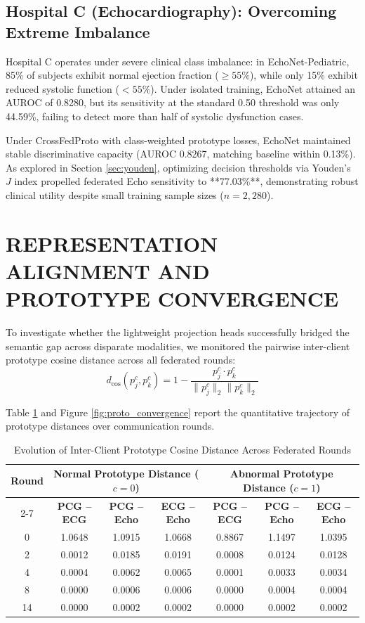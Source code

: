 \documentclass[12pt,a4paper]{amritareport}
\begin{document}
\subsection{Hospital C (Echocardiography): Overcoming Extreme Imbalance}
Hospital C operates under severe clinical class imbalance: in EchoNet-Pediatric, 85\% of subjects exhibit normal ejection fraction ($\geq 55\%$), while only 15\% exhibit reduced systolic function ($< 55\%$). Under isolated training, EchoNet attained an AUROC of 0.8280, but its sensitivity at the standard 0.50 threshold was only 44.59\%, failing to detect more than half of systolic dysfunction cases.

Under CrossFedProto with class-weighted prototype losses, EchoNet maintained stable discriminative capacity (AUROC 0.8267, matching baseline within 0.13\%). As explored in Section \ref{sec:youden}, optimizing decision thresholds via Youden's $J$ index propelled federated Echo sensitivity to **77.03\%**, demonstrating robust clinical utility despite small training sample sizes ($n=2,280$).


\section{REPRESENTATION ALIGNMENT AND PROTOTYPE CONVERGENCE}

To investigate whether the lightweight projection heads successfully bridged the semantic gap across disparate modalities, we monitored the pairwise inter-client prototype cosine distance across all federated rounds:
\begin{equation}
	d_{\cos}(p_j^c, p_k^c) = 1 - \frac{p_j^c \cdot p_k^c}{\|p_j^c\|_2 \|p_k^c\|_2}
\end{equation}

Table \ref{tab:proto_distance} and Figure \ref{fig:proto_convergence} report the quantitative trajectory of prototype distances over communication rounds.

\begin{table}[htbp]
	\centering
	\caption{Evolution of Inter-Client Prototype Cosine Distance Across Federated Rounds}
	\label{tab:proto_distance}
	\begin{tabular}{|c|c|c|c|c|c|c|}
		\hline
		\multirow{2}{*}{\textbf{Round}} & \multicolumn{3}{c|}{\textbf{Normal Prototype Distance ($c=0$)}} & \multicolumn{3}{c|}{\textbf{Abnormal Prototype Distance ($c=1$)}} \\
		\cline{2-7}
		& \textbf{PCG -- ECG} & \textbf{PCG -- Echo} & \textbf{ECG -- Echo} & \textbf{PCG -- ECG} & \textbf{PCG -- Echo} & \textbf{ECG -- Echo} \\
		\hline
		0 & 1.0648 & 1.0915 & 1.0668 & 0.8867 & 1.1497 & 1.0395 \\
		2 & 0.0012 & 0.0185 & 0.0191 & 0.0008 & 0.0124 & 0.0128 \\
		4 & 0.0004 & 0.0062 & 0.0065 & 0.0001 & 0.0033 & 0.0034 \\
		8 & 0.0000 & 0.0006 & 0.0006 & 0.0000 & 0.0004 & 0.0004 \\
		14 & 0.0000 & 0.0002 & 0.0002 & 0.0000 & 0.0002 & 0.0002 \\
		\hline
	\end{tabular}
\end{table}
\end{document}

